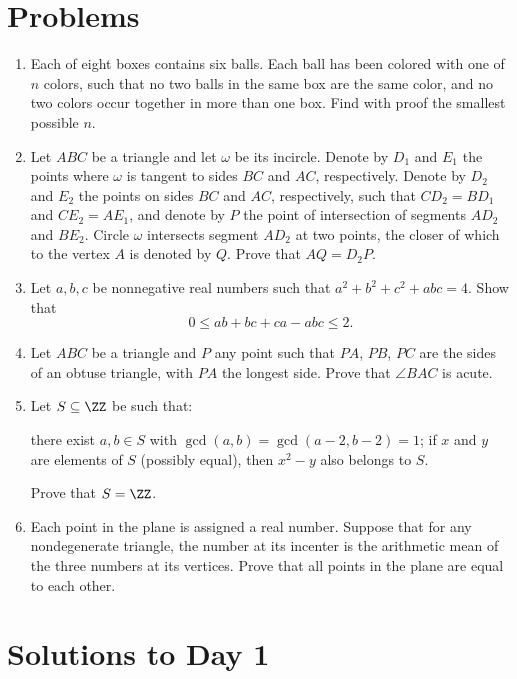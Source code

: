 \documentclass[11pt]{scrartcl}
\begin{document}
\section{Problems}
\begin{enumerate}[\bfseries 1.]
\item %
Each of eight boxes contains six balls.
Each ball has been colored with one of $n$ colors,
such that no two balls in the same box are the same color,
and no two colors occur together in more than one box.
Find with proof the smallest possible $n$.

\item %
Let $ABC$ be a triangle and let $\omega$ be its incircle.
Denote by $D_1$ and $E_1$ the points where $\omega$
is tangent to sides $BC$ and $AC$, respectively.
Denote by $D_2$ and $E_2$ the points on sides $BC$ and $AC$,
respectively, such that $CD_2=BD_1$ and $CE_2=AE_1$,
and denote by $P$ the point of intersection of segments $AD_2$ and $BE_2$.
Circle $\omega$ intersects segment $AD_2$ at two points,
the closer of which to the vertex $A$ is denoted by $Q$.
Prove that $AQ=D_2P$.

\item %
Let $a, b, c$ be nonnegative real numbers
such that $a^2+b^2+c^2 + abc = 4$.
Show that \[ 0 \le ab + bc + ca - abc \le 2. \]

\item %
Let $ABC$ be a triangle and $P$ any point
such that $PA$, $PB$, $PC$ are the sides of an obtuse triangle,
with $PA$ the longest side.
Prove that $\angle BAC$ is acute.

\item %
Let $S \subseteq \ZZ$ be such that:
\begin{enumerate}
  \ii[(a)] there exist $a,b \in S$ with
  $\gcd(a,b) = \gcd(a-2, b-2) = 1$;
  \ii[(b)] if $x$ and $y$ are elements of $S$ (possibly equal),
  then $x^2-y$ also belongs to $S$.
\end{enumerate}
Prove that $S = \ZZ$.

\item %
Each point in the plane is assigned a real number.
Suppose that for any nondegenerate triangle, the number at its incenter
is the arithmetic mean of the three numbers at its vertices.
Prove that all points in the plane are equal to each other.

\end{enumerate}
\pagebreak

\section{Solutions to Day 1}
\end{document}
